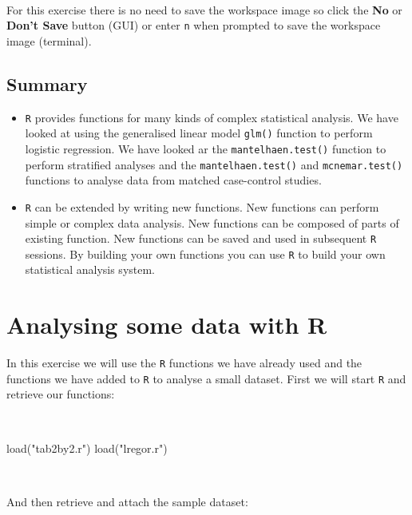 \documentclass[
  12pt,
  a4paper]{book}
\newenvironment{Shaded}{\begin{snugshade}}{\end{snugshade}}
\newcommand{\FunctionTok}[1]{\textcolor[rgb]{0.00,0.00,0.00}{#1}}
\newcommand{\NormalTok}[1]{#1}
\newcommand{\StringTok}[1]{\textcolor[rgb]{0.31,0.60,0.02}{#1}}
\begin{document}
~

For this exercise there is no need to save the workspace image so click the \textbf{No} or \textbf{Don't Save} button (GUI) or enter \texttt{n} when prompted to save the workspace image (terminal).

\hypertarget{summary-2}{%
\section{Summary}\label{summary-2}}

\begin{itemize}
\item
  \texttt{R} provides functions for many kinds of complex statistical analysis. We have looked at using the generalised linear model \texttt{glm()} function to perform logistic regression. We have looked ar the \texttt{mantelhaen.test()} function to perform stratified analyses and the \texttt{mantelhaen.test()} and \texttt{mcnemar.test()} functions to analyse data from matched case-control studies.
\item
  \texttt{R} can be extended by writing new functions. New functions can perform simple or complex data analysis. New functions can be composed of parts of existing function. New functions can be saved and used in subsequent \texttt{R} sessions. By building your own functions you can use \texttt{R} to build your own statistical analysis system.
\end{itemize}

\hypertarget{exercise4}{%
\chapter{Analysing some data with R}\label{exercise4}}

In this exercise we will use the \texttt{R} functions we have already used and the functions we have added to \texttt{R} to
analyse a small dataset. First we will start \texttt{R} and retrieve our functions:

~

\begin{Shaded}
\begin{Highlighting}[]
\FunctionTok{load}\NormalTok{(}\StringTok{"tab2by2.r"}\NormalTok{)}
\FunctionTok{load}\NormalTok{(}\StringTok{"lregor.r"}\NormalTok{)}
\end{Highlighting}
\end{Shaded}

~

And then retrieve and attach the sample dataset:
\end{document}
